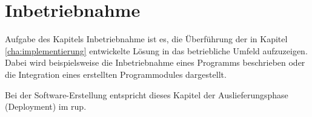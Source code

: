 \chapter{Inbetriebnahme}
\label{cha:inbetriebnahme}

Aufgabe des Kapitels Inbetriebnahme ist es, die Überführung der in 
Kapitel \ref{cha:implementierung} entwickelte Lösung in das betriebliche 
Umfeld aufzuzeigen. Dabei wird beispielsweise die Inbetriebnahme eines 
Programms beschrieben oder die Integration eines erstellten 
Programmodules dargestellt.

Bei der Software-Erstellung entspricht dieses Kapitel der 
Auslieferungsphase (Deployment) im \ac{rup}.

